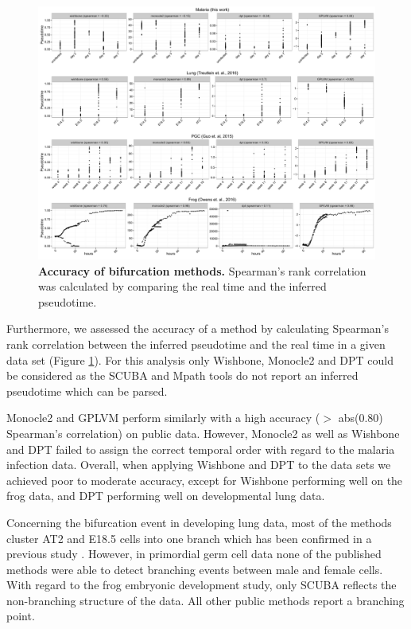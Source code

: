 \begin{figure}
    \centering
    \includegraphics[width=\textwidth]{"realtime_vs_pseudotime_accuracy"}
    \caption[Accuracy of bifurcation methods]{\textbf{Accuracy of bifurcation methods.} Spearman's rank correlation was calculated by comparing the real time and the inferred pseudotime.}
    \label{fig:real_vs_pseudo}
\end{figure}

Furthermore, we assessed the accuracy of a method by calculating Spearman's rank correlation between the inferred pseudotime and the real time in a given data set (Figure \ref{fig:real_vs_pseudo}). For this analysis only Wishbone, Monocle2 and DPT could be considered as the SCUBA and Mpath tools do not report an inferred pseudotime which can be parsed.

Monocle2 and GPLVM perform similarly with a high accuracy ($>$ abs(0.80) Spearman's correlation) on public data. However, Monocle2 as well as Wishbone and DPT failed to assign the correct temporal order with regard to the malaria infection data. Overall, when applying Wishbone and DPT to the data sets we achieved poor to moderate accuracy, except for Wishbone performing well on the frog data, and DPT performing well on developmental lung data.

Concerning the bifurcation event in developing lung data, most of the methods cluster AT2 and E18.5  cells into one branch which has been confirmed in a previous study \cite{Treutlein2014-rz}. However, in primordial germ cell data none of the published methods were able to detect branching  events between male and female cells. With regard to the frog embryonic development study, only SCUBA reflects the non-branching structure of the data. All other public methods report a branching point.

